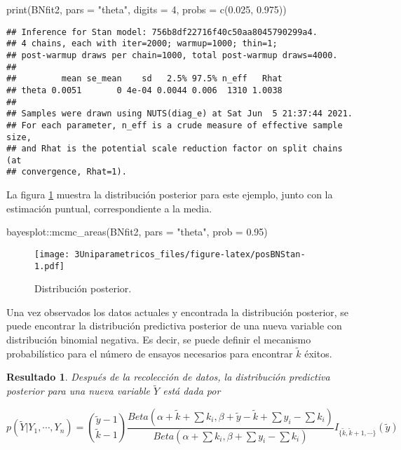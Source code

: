 \documentclass[
  12pt,
  spanish,
]{book}
\newenvironment{Shaded}{\begin{snugshade}}{\end{snugshade}}
\newcommand{\AttributeTok}[1]{\textcolor[rgb]{0.77,0.63,0.00}{#1}}
\newcommand{\DecValTok}[1]{\textcolor[rgb]{0.00,0.00,0.81}{#1}}
\newcommand{\FloatTok}[1]{\textcolor[rgb]{0.00,0.00,0.81}{#1}}
\newcommand{\FunctionTok}[1]{\textcolor[rgb]{0.00,0.00,0.00}{#1}}
\newcommand{\NormalTok}[1]{#1}
\newcommand{\SpecialCharTok}[1]{\textcolor[rgb]{0.00,0.00,0.00}{#1}}
\newcommand{\StringTok}[1]{\textcolor[rgb]{0.31,0.60,0.02}{#1}}
\newtheorem{proposition}{Resultado}[chapter]
\theoremstyle{definition}
\theoremstyle{definition}
\theoremstyle{definition}
\theoremstyle{definition}
\theoremstyle{remark}
\begin{document}
\begin{Shaded}
\begin{Highlighting}[]
\FunctionTok{print}\NormalTok{(BNfit2, }\AttributeTok{pars =} \StringTok{"theta"}\NormalTok{, }
      \AttributeTok{digits =} \DecValTok{4}\NormalTok{, }\AttributeTok{probs =} \FunctionTok{c}\NormalTok{(}\FloatTok{0.025}\NormalTok{, }\FloatTok{0.975}\NormalTok{))}
\end{Highlighting}
\end{Shaded}

\begin{verbatim}
## Inference for Stan model: 756b8df22716f40c50aa8045790299a4.
## 4 chains, each with iter=2000; warmup=1000; thin=1; 
## post-warmup draws per chain=1000, total post-warmup draws=4000.
## 
##         mean se_mean    sd   2.5% 97.5% n_eff   Rhat
## theta 0.0051       0 4e-04 0.0044 0.006  1310 1.0038
## 
## Samples were drawn using NUTS(diag_e) at Sat Jun  5 21:37:44 2021.
## For each parameter, n_eff is a crude measure of effective sample size,
## and Rhat is the potential scale reduction factor on split chains (at 
## convergence, Rhat=1).
\end{verbatim}

La figura \ref{fig:posBNStan} muestra la distribución posterior para este ejemplo, junto con la estimación puntual, correspondiente a la media.

\begin{Shaded}
\begin{Highlighting}[]
\NormalTok{bayesplot}\SpecialCharTok{::}\FunctionTok{mcmc\_areas}\NormalTok{(BNfit2, }\AttributeTok{pars =} \StringTok{"theta"}\NormalTok{, }
                      \AttributeTok{prob =} \FloatTok{0.95}\NormalTok{)}
\end{Highlighting}
\end{Shaded}

\begin{figure}
\centering
\texttt{[image: 3Uniparametricos\_files/figure-latex/posBNStan-1.pdf]}
\caption{\label{fig:posBNStan}Distribución posterior.}
\end{figure}

Una vez observados los datos actuales y encontrada la distribución posterior, se puede encontrar la distribución predictiva posterior de una nueva variable con distribución binomial negativa. Es decir, se puede definir el mecanismo probabilístico para el número de ensayos necesarios para encontrar \(\tilde{k}\) éxitos.

\begin{proposition}
\protect\hypertarget{prp:unnamed-chunk-39}{}{\label{prp:unnamed-chunk-39} }Después de la recolección de datos, la distribución predictiva posterior para una nueva variable \(\tilde{Y}\) está dada por

\begin{equation*}
p(\tilde{Y}|Y_1,\cdots,Y_n)=\binom{\tilde{y}-1}{\tilde{k}-1}\frac{Beta(\alpha+\tilde{k}+\sum k_i,\beta+\tilde{y}-\tilde{k}+\sum y_i-\sum k_i)}{Beta(\alpha+\sum k_i,\beta+\sum y_i-\sum k_i)}I_{\{\tilde{k},\tilde{k}+1,\cdots\}}(\tilde{y})
\end{equation*}
\end{proposition}
\end{document}
